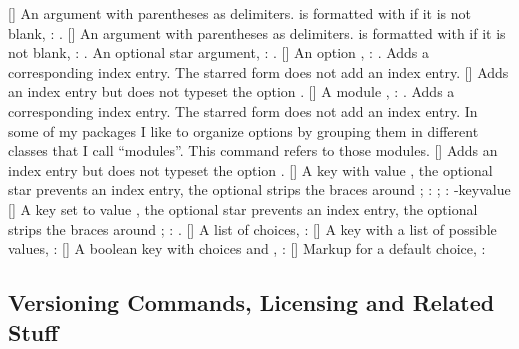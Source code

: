 \documentclass[load-preamble+,babel-options={ngerman,english}]{cnltx-doc}
\begin{document}
\begin{commands}
  []
    An argument with parentheses as delimiters.  is formatted with
     if it is not blank, : .
  []
    An argument with parentheses as delimiters. 
    is formatted with  if it is not blank, :
    .
    An optional star argument, : \sarg.
  [\sarg{}]
    An option , : .  Adds a
    corresponding index entry.  The starred form does not add an index entry.
  []
    Adds an index entry but does not typeset the option .
  [\sarg{}]
    A module , : .  Adds a
    corresponding index entry.  The starred form does not add an index entry.
    In some of my packages I like to organize options by grouping them in
    different classes that I call ``modules''.  This command refers to those
    modules.
  [\sarg{}]
    Adds an index entry but does not typeset the option .
  [\sarg\code{-}]
    A key  with value , the optional star prevents an
    index entry, the  optional \code{-} strips the braces around ;
    : ;
    \code{-}: \key-{key}{value}
  [\sarg\code{-}]
    A key  set to value , the
    optional star prevents an index entry, the  optional \code{-} strips the
    braces around ; :
    .
  []
    A list of choices, :
  []
    A key  with a list of possible values,
    :
  []
    A boolean key  with choices  and ,
    : 
  []
    Markup for a default choice,
    :
\end{commands}


\subsection{Versioning Commands, Licensing and Related  Stuff}\label{sec:cmds:versioning}
\end{document}

